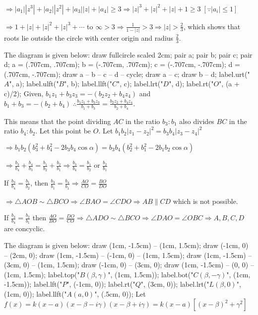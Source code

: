   $\Rightarrow |a_1||z^3| + |a_2||z^2| + |a_3||z| + |a_4|\geq 3 \Rightarrow |z|^3 + |z|^2 + |z| + 1\geq
  3\;[\because |a_i|\leq 1]$

  $\Rightarrow 1 + |z| + |z|^2 + |z|^3 + \cdots $ to $\infty > 3 \Rightarrow \frac{1}{1 - |z|} > 3
  \Rightarrow |z| > \frac{2}{3}$, which shows that roots lie outside the circle with center origin and
  radius $\frac{2}{3}$.
\item The diagram is given below:
  \startplacefigure[location={left, none}]
    \startMPcode
      draw fullcircle scaled 2cm;
      pair a; pair b; pair c; pair d;
      a = (.707cm, .707cm); b = (-.707cm, .707cm); c = (-.707cm, -.707cm); d = (.707cm, -.707cm);
      draw a -- b -- c -- d -- cycle;
      draw a -- c; draw b -- d;
      label.urt("$A$", a);
      label.ulft("$B$", b);
      label.llft("$C$", c);
      label.lrt("$D$", d);
      label.rt("$O$", (a + c)/2);
    \stopMPcode
  \stopplacefigure
  Given, $b_1z_1 + b_3z_3 = -(b_2z_2 + b_4z_4)$ and $b_1 + b_3 = -(b_2 + b_4)\;\therefore \frac{b_1z_1 +
    b_3z_3}{b_1 + b_3} = \frac{b_2z_2 + b_4z_4}{b_2 + b_4}$.

  This means that the point dividing $AC$ in the ratio $b_3:b_1$ also divides $BC$ in the ratio
  $b_4:b_2$. Let this point be $O$. Let $b_1b_2|z_1 - z_2|^2 = b_3b_4|z_3 - z_4|^2$

  $\Rightarrow b_1b_2(b_3^2 + b_4^2 - 2b_3b_4\cos\alpha) = b_3b_4(b_2^2 + b_1^2 - 2b_1b_2\cos\alpha)$

  $\Rightarrow \frac{b_3}{b_4} + \frac{b_4}{b_3} = \frac{b_1}{b_2} + \frac{b_2}{b_1}\Rightarrow
  \frac{b_3}{b_4} = \frac{b_1}{b_2}$ or $\frac{b_2}{b_1}$

  If $\frac{b_3}{b_4} = \frac{b_1}{b_2}$, then $\frac{b_3}{b_1} = \frac{b_4}{b_1} \Rightarrow \frac{AO}{CO}
  = \frac{BO}{DO}$

  $\Rightarrow \triangle AOB\sim\triangle BCO \Rightarrow \angle BAO = \angle CDO \Rightarrow AB\parallel
  CD$ which is not possible.

  If $\frac{b_3}{b_4} = \frac{b_2}{b_1}$ then $\frac{AO}{BO} = \frac{DO}{CO}\Rightarrow \triangle
  ADO\sim\triangle BCO\Rightarrow \angle DAO = \angle OBC\Rightarrow A, B, C, D$ are concyclic.
\item The diagram is given below:
  \startplacefigure[location={left, none}]
    \startMPcode
      draw (1cm, -1.5cm) -- (1cm, 1.5cm);
      draw (-1cm, 0) -- (2cm, 0);
      draw (1cm, -1.5cm) -- (-1cm, 0) -- (1cm, 1.5cm);
      draw (1cm, -1.5cm) -- (3cm, 0) -- (1cm, 1.5cm);
      draw (-1cm, 0) -- (3cm, 0);
      draw (1cm, -1.5cm) -- (0, 0) -- (1cm, 1.5cm);
      label.top("$B(\beta, \gamma)$", (1cm, 1.5cm));
      label.bot("$C(\beta, -\gamma)$", (1cm, -1.5cm));
      label.lft("$P$", (-1cm, 0));
      label.rt("$Q$", (3cm, 0));
      label.lrt("$L(\beta, 0)$", (1cm, 0));
      label.llft("$A(a, 0)$", (.5cm, 0));
    \stopMPcode
  \stopplacefigure
  Let $f(x) = k(x - a)(x - \beta - i\gamma)(x - \beta + i\gamma) = k(x - a)[(x - \beta)^2 + \gamma^2]$

